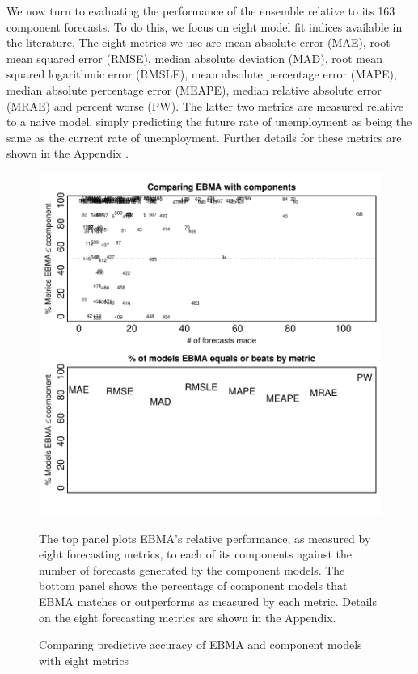 \documentclass[12pt,fullpage,endnotes]{article}
\begin{document}
We now turn to evaluating the performance of the ensemble relative to
its 163 component forecasts.  To do this, we focus on eight model fit
indices available in the literature.  The eight metrics we use are
mean absolute error (MAE), root mean squared error (RMSE), median
absolute deviation (MAD), root mean squared logarithmic error (RMSLE),
mean absolute percentage error (MAPE), median absolute percentage
error (MEAPE), median relative absolute error (MRAE) and percent worse
(PW).  The latter two metrics are measured relative to a naive model,
simply predicting the future rate of unemployment as being the same as
the current rate of unemployment.  Further details for these metrics
are shown in the Appendix \citep{brandt:freeman:schrodt:2011}.


\begin{figure}[h]
\caption{Comparing predictive accuracy of EBMA and component models with eight metrics}
\label{compare2Components}
\begin{center}
\includegraphics{compare2Components}
\end{center}

The top panel plots EBMA's relative performance, as measured by eight
forecasting metrics, to each of its components against the number of
forecasts generated by the component models.  The bottom panel shows
the percentage of component models that EBMA matches or outperforms as
measured by each metric.  Details on the eight forecasting metrics are
shown in the Appendix.


\end{figure}
\end{document}

